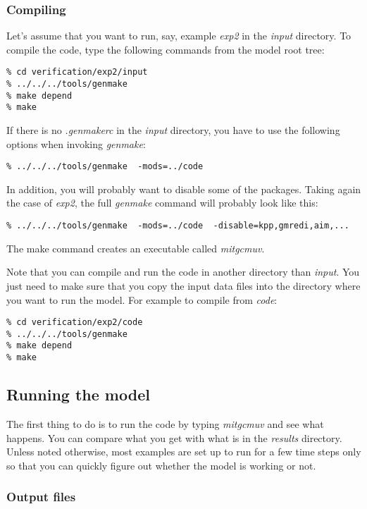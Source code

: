 \subsubsection{Compiling}

Let's assume that you want to run, say, example \textit{exp2} in the \textit{%
input} directory. To compile the code, type the following commands from the
model root tree:
\begin{verbatim}
% cd verification/exp2/input
% ../../../tools/genmake
% make depend
% make
\end{verbatim}

If there is no \textit{.genmakerc} in the \textit{input} directory, you have
to use the following options when invoking \textit{genmake}:
\begin{verbatim}
% ../../../tools/genmake  -mods=../code
\end{verbatim}

In addition, you will probably want to disable some of the packages. Taking
again the case of \textit{exp2}, the full \textit{genmake} command will
probably look like this:
\begin{verbatim}
% ../../../tools/genmake  -mods=../code  -disable=kpp,gmredi,aim,...
\end{verbatim}

The make command creates an executable called \textit{mitgcmuv}.

Note that you can compile and run the code in another directory than \textit{%
input}. You just need to make sure that you copy the input data files into
the directory where you want to run the model. For example to compile from 
\textit{code}:
\begin{verbatim}
% cd verification/exp2/code
% ../../../tools/genmake
% make depend
% make
\end{verbatim}

\subsection{Running the model}

The first thing to do is to run the code by typing \textit{mitgcmuv} and see
what happens. You can compare what you get with what is in the \textit{%
results} directory. Unless noted otherwise, most examples are set up to run
for a few time steps only so that you can quickly figure out whether the
model is working or not.

\subsubsection{Output files}

